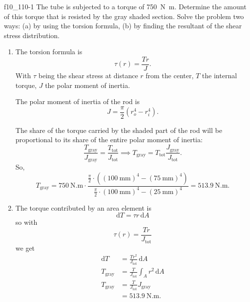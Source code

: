 
\begin{problemwithimage}{f10_1}{10-1}
  The tube is subjected to a torque of \qty{750}{\N.\m}.
  Determine the amount of this torque that is resisted by the gray shaded section.
  Solve the problem two ways: (a) by using the torsion formula, (b) by finding the resultant of the shear stress distribution.
\end{problemwithimage}

\begin{derivation}
  \begin{enumerate}[label=(\alph*)]
    \item The torsion formula is
      \begin{equation*}
        \tau(r) = \frac{T r}{J}
      .\end{equation*}
      With $\tau$ being the shear stress at distance $r$ from the center, $T$ the internal torque, $J$ the polar moment of inertia.

      The polar moment of inertia of the rod is
      \begin{equation*}
        J = \frac{\pi}{2} \left( r_o^{4} - r_i^{4} \right)
      .\end{equation*}
      
      The share of the torque carried by the shaded part of the rod will be proportional to its share of the entire polar moment of inertia:
      \begin{equation*}
        \frac{T_{\mathrm{gray}}}{J_{\mathrm{gray}}} = \frac{T_{\mathrm{tot}}}{J_{\mathrm{tot}}} \implies T_{\mathrm{gray}} = T_{\mathrm{tot}} \frac{J_{\mathrm{gray}}}{J_{\mathrm{tot}}}
      .\end{equation*}
      So,
      \begin{equation*}
      T_{\mathrm{gray}} = \qty{750}{\N.\m} \cdot \frac{\frac{\pi}{2} \cdot \left( \left( \qty{100}{\mm}  \right)^4 - \left( \qty{75}{\mm} \right)^4 \right)}{\frac{\pi}{2} \cdot \left( \qty{100}{\mm}  \right)^{4} - \left( \qty{25}{\mm}  \right)^{4}} = \qty{513,9}{\N.\m}
    .\end{equation*}
  \item The torque contributed by an area element is
    \begin{equation*}
      \mathrm{d}T = \tau r \, \mathrm{d}A
    \end{equation*}
    so with
    \begin{equation*}
      \tau(r) = \frac{T r}{J_{\mathrm{tot}}}
    \end{equation*}
    we get
    \begin{align*}
      \mathrm{d}T &= \frac{T r^2}{J_{\mathrm{tot}}} \, \mathrm{d}A \\
      T_{\mathrm{gray}} &= \frac{T}{J_{\mathrm{tot}}} \int_A r^2 \, \mathrm{d}A \\
      T_{\mathrm{gray}} &= \frac{T}{J_{\mathrm{tot}}} J_{\mathrm{gray}} \\
      &= \qty{513,9}{\N.\m} 
    .\end{align*}
  \end{enumerate}
\end{derivation}

